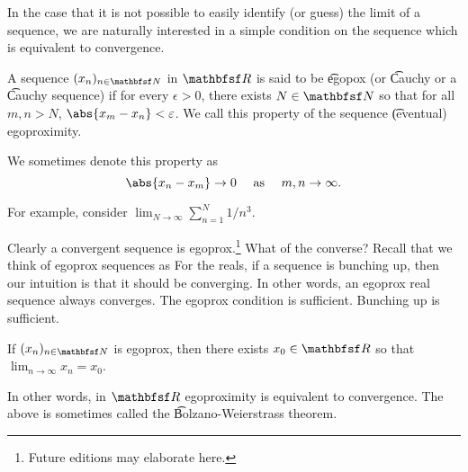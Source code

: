 

In the case that it is not possible to easily identify (or guess) the limit of a sequence, we are naturally interested in a simple condition on the sequence which is equivalent to convergence.


A sequence $(x_n)_{n \in \N}$ in $\R$ is said to be \t{egopox} (or \t{Cauchy} or a \t{Cauchy sequence}) if for every $\epsilon > 0$, there exists $N \in \N$ so that for all $m, n > N$, $\abs{x_m - x_n} < \epsilon$.
We call this property of the sequence \t{(eventual) egoproximity}.


We sometimes denote this property as
\[
    \abs{x_n - x_m} \to 0 \quad \text{ as } \quad m, n \to \infty.
\]


For example, consider $\lim_{N \to \infty} \sum_{n = 1}^{N} 1/n^3$.


Clearly a convergent sequence is egoprox.\footnote{Future editions may elaborate here.}
What of the converse?
Recall that we think of egoprox sequences as 
For the reals, if a sequence is bunching up, then our intuition is that it should be converging.
In other words, an egoprox real sequence always converges.
The egoprox condition is sufficient.
Bunching up is sufficient.

\begin{proposition}
  If $(x_n)_{n \in \N}$ is egoprox, then there exists $x_0 \in \R$ so that $\lim_{n \to \infty} x_n = x_0$.
\end{proposition}

In other words, in $\R$ egoproximity is equivalent to convergence.
The above is sometimes called the \t{Bolzano-Weierstrass theorem}.

\blankpage

